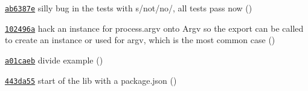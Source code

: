 \begin{DoxyItemize}
\item \href{https://github.com/bcoe/yargs/commit/ab6387e6769ca4af82ca94c4c67c7319f0d9fcfa}{\tt ab6387e} silly bug in the tests with s/not/no/, all tests pass now ()
\item \href{https://github.com/bcoe/yargs/commit/102496a319e8e06f6550d828fc2f72992c7d9ecc}{\tt 102496a} hack an instance for process.\+argv onto Argv so the export can be called to create an instance or used for argv, which is the most common case ()
\item \href{https://github.com/bcoe/yargs/commit/a01caeb532546d19f68f2b2b87f7036cfe1aaedd}{\tt a01caeb} divide example ()
\item \href{https://github.com/bcoe/yargs/commit/443da55736acbaf8ff8b04d1b9ce19ab016ddda2}{\tt 443da55} start of the lib with a package.\+json () 
\end{DoxyItemize}
